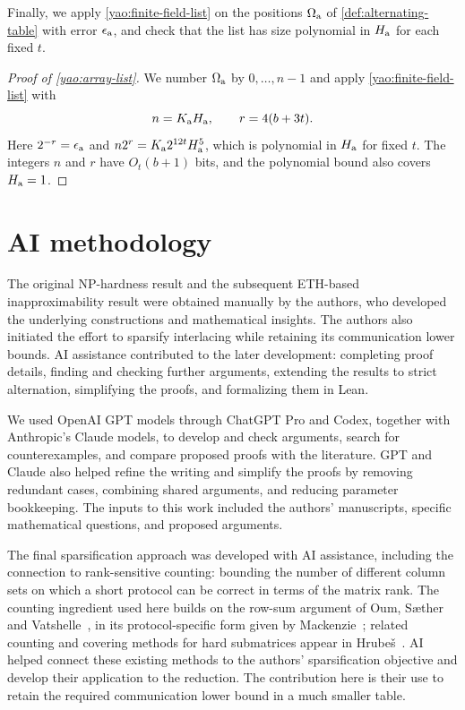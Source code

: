 \documentclass[11pt,letterpaper]{article} \usepackage[utf8]{inputenc}
\theoremstyle{plain} \newtheorem{theorem}{Theorem}[section]
\theoremstyle{definition} \newaliascnt{definition}{theorem}
\begin{document}
Finally, we apply \cref{yao:finite-field-list} on the positions
$\Omega_{\rm a}$ of \cref{def:alternating-table} with error $\epsilon_{\rm a}$,
and check that the list has size polynomial in $H_{\rm a}$ for each fixed $t$.

\begin{proof}[Proof of \cref{yao:array-list}]
\label{proof:yao:array-list}
We number $\Omega_{\rm a}$ by $0,\ldots,n-1$ and apply
\cref{yao:finite-field-list} with
\[
n=K_{\rm a}H_{\rm a},\qquad r=4(b+3t).
\]
Here $2^{-r}=\epsilon_{\rm a}$ and
$n2^r=K_{\rm a}2^{12t}H_{\rm a}^5$, which is polynomial in $H_{\rm a}$
for fixed $t$. The integers $n$ and $r$ have $O_t(b+1)$ bits, and the
polynomial bound also covers $H_{\rm a}=1$.
\end{proof}

\section*{AI methodology}
\label{sec:ai-methodology}

The original NP-hardness result and the subsequent ETH-based
inapproximability result were obtained manually by the authors, who
developed the underlying constructions and mathematical insights. The
authors also initiated the effort to sparsify interlacing while retaining
its communication lower bounds. AI assistance contributed to the later
development: completing proof details, finding and checking further
arguments, extending the results to strict alternation, simplifying the
proofs, and formalizing them in Lean.

We used OpenAI GPT models through ChatGPT Pro and Codex, together with
Anthropic's Claude models, to develop and check arguments, search for
counterexamples, and compare proposed proofs with the literature. GPT and
Claude also helped refine the writing and simplify the proofs by removing
redundant cases, combining shared arguments, and reducing parameter
bookkeeping. The inputs to this work included the authors' manuscripts,
specific mathematical questions, and proposed arguments.

The final sparsification approach was developed with AI assistance,
including the connection to rank-sensitive counting: bounding the number
of different column sets on which a short protocol can be correct in
terms of the matrix rank. The counting ingredient used here builds on
the row-sum argument of Oum, S{\ae}ther and
Vatshelle~\cite[Theorem~4.2]{oum2014faster}, in its protocol-specific form
given by Mackenzie~\cite[Lemma~4.3]{mackenzie2026condensation}; related
counting and covering methods for hard submatrices appear in
Hrube{\v s}~\cite{hrubes2025hard}. AI helped connect these existing methods
to the authors' sparsification objective and develop their application to
the reduction. The contribution here is their use to retain the required
communication lower bound in a much smaller table.
\end{document}
